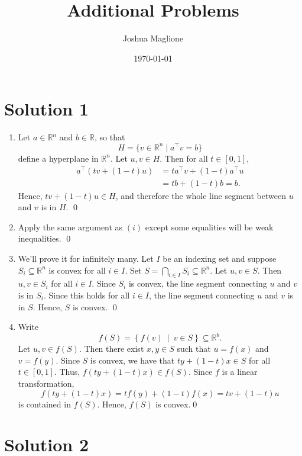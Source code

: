 \documentclass[a4paper, 12pt]{article}
\title{Additional Problems}
\author{Joshua Maglione}
\date{\today}
\numberwithin{equation}{section}
\numberwithin{figure}{section}
\theoremstyle{definition}
\newcommand{\R}{\mathbb{R}}
\begin{document}
\maketitle

\section*{Solution 1}

\begin{enumerate}[label=$(\roman* )$]
    \item Let $a\in \mathbb{R}^n$ and $b\in \R$, so that 
    \[ 
        H = \{ v\in \mathbb{R}^n \mid a^{\top}v = b\} 
    \]
    define a hyperplane in $\mathbb{R}^n$. Let $u,v\in H$. Then for all $t\in [0,1]$, 
    \begin{align*}
        a^{\top}(t v + (1 - t) u) &= t a^{\top}v + (1 - t) a^{\top} u \\
        &= tb + (1-t)b = b.
    \end{align*}
    Hence, $tv+(1-t)u\in H$, and therefore the whole line segment between $u$
    and $v$ is in $H$. \qed 
    \item Apply the same argument as $(i)$ except some equalities will be weak
    inequalities. \qed
    \item We'll prove it for infinitely many. Let $I$ be an indexing set and
    suppose $S_i\subseteq \mathbb{R}^n$ is convex for all $i\in I$. Set $S =
    \bigcap_{i\in I}S_i \subseteq \mathbb{R}^n$. Let $u,v\in S$. Then $u,v\in
    S_i$ for all $i\in I$. Since $S_i$ is convex, the line segment connecting
    $u$ and $v$ is in $S_i$. Since this holds for all $i\in I$, the line segment
    connecting $u$ and $v$ is in $S$. Hence, $S$ is convex. \qed
    \item Write 
    \[
        f(S) = \left\{ f(v) ~\middle|~ v\in S \right\} \subseteq \mathbb{R}^b.
    \]
    Let $u,v\in f(S)$. Then there exist $x,y\in S$ such that $u=f(x)$ and
    $v=f(y)$. Since $S$ is convex, we have that $ty + (1-t)x\in S$ for all $t\in
    [0,1]$. Thus, $f(ty + (1-t)x)\in f(S)$. Since $f$ is a linear
    transformation, 
    \[ 
        f(ty + (1-t)x) = tf(y) + (1-t)f(x) =tv + (1-t)u
    \]
    is contained in $f(S)$. Hence, $f(S)$ is convex.\qed
\end{enumerate}

\section*{Solution 2}
\end{document}

